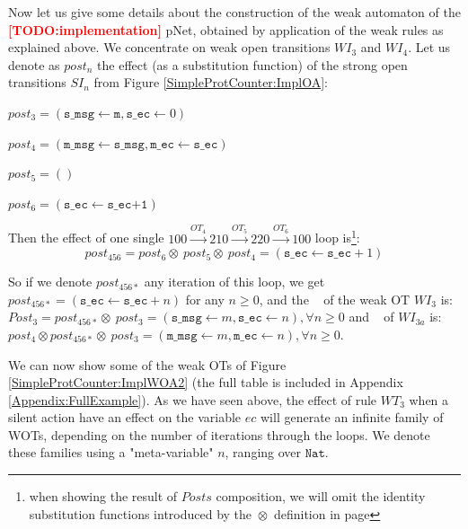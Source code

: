 \documentclass{lmcs}
\newcommand{\TODO}[1]{\textcolor{red}{\textbf{[TODO:#1]}}}
\newcommand{\shortotimes}{\!\otimes\!}
\begin{document}
Now let us give some details about the construction of the weak automaton of the \TODO{implementation} pNet, obtained by application of the weak rules as explained above. We concentrate on weak open transitions $WI_3$ and $WI_4$. Let us denote as $post_n$ the effect (as a substitution function) of the strong open transitions $SI_n$ from Figure \ref{SimpleProtCounter:ImplOA}:
\smallskip

$post_3 = (\texttt{s\_msg}\gets \texttt{m}, \texttt{s\_ec}\gets 0)$

$post_4 = (\texttt{m\_msg}\gets \texttt{s\_msg}, \texttt{m\_ec}\gets \texttt{s\_ec})$

$post_5 = ()$

$post_6 = (\texttt{s\_ec}\gets \texttt{s\_ec+1})$

\medskip

Then the effect of one single $100 \xrightarrow{OT_4} 210 \xrightarrow{OT_5} 220 \xrightarrow{OT_6} 100$ loop is\footnote{when showing  the result of $Posts$ composition, we will omit the identity substitution functions introduced by the $\shortotimes$ definition in page \pageref{def:substitutions}}:
\[post_{456} = post_6 \shortotimes\ post_5 \shortotimes\ post_4
= (\texttt{s\_ec}\gets \texttt{s\_ec}+1)\]

So if we denote ${post_{456*}}$ any iteration of this loop, we get ${post_{456*}} = (\texttt{s\_ec}\gets \texttt{s\_ec}+n)$ for any $n\ge 0$, and the \Post~ of the weak OT  $WI_{3}$ is:\\
 $Post_3 = post_{456*}\shortotimes\ post_3 = (\texttt{s\_msg}\gets m, \texttt{s\_ec}\gets n), \forall n\ge 0$ and \Post~ of  $WI_{3a}$  is:\\ $post_4\shortotimes {post_{456*}}\shortotimes\ post_3 = (\texttt{m\_msg}\gets m, \texttt{m\_ec}\gets n), \forall n\ge 0$.
\medskip

We can now show some of the weak OTs of Figure \ref{SimpleProtCounter:ImplWOA2} (the full table is included in Appendix \ref{Appendix:FullExample}).
As we have seen above, the effect of rule $WT_3$ when a silent action have an effect on the variable $ec$ will generate an infinite family of WOTs, depending on the number of iterations through the loops. We denote these families using a "meta-variable" $n$, ranging over $\texttt{Nat}$.
\smallskip
\end{document}
